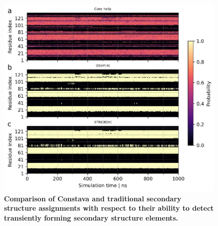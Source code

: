 \begin{figure}[H]
    \centering
    \includegraphics[width=\linewidth]{constava//sup_figs/supfig9.pdf}
    \caption{\textbf{Comparison of Constava and traditional secondary structure assignments with respect to their ability to detect transiently forming secondary structure elements. }
    }
    \label{fig:sup_fig_constava:detect_trasient}
\end{figure}

